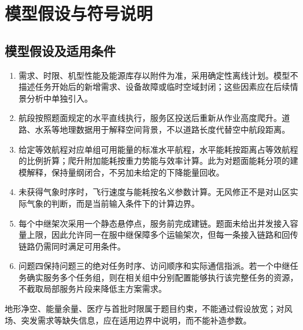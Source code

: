 \section{模型假设与符号说明}
\subsection{模型假设及适用条件}
\begin{enumerate}
\item 需求、时限、机型性能及能源库存以附件为准，采用确定性离线计划。模型不描述任务开始后的新增需求、设备故障或临时空域封闭；这些因素应在后续情景分析中单独引入。
\item 航段按照题面规定的水平直线执行，服务区投送后重新从作业高度爬升。道路、水系等地理数据用于解释空间背景，不以道路长度代替空中航段距离。
\item 给定等效航程对应单组可用能量的标准水平航程，水平能耗按距离占等效航程的比例折算；爬升附加能耗按重力势能与效率计算。此为对题面能耗分项的建模解释，保持量纲闭合，不另加未给定的下降能量回收。
\item 未获得气象时序时，飞行速度与能耗按名义参数计算。无风修正不是对山区实际气象的判断，而是当前输入条件下的计算边界。
\item 每个中继架次采用一个静态悬停点，服务前完成建链。题面未给出并发接入容量上限，因此允许同一在服中继保障多个运输架次，但每一条接入链路和回传链路仍需同时满足可用条件。
\item 问题四保持问题三的绝对任务时序、访问顺序和实际通信指派。若一个中继任务确实服务多个任务组，则在相关组中分别配置能够执行该完整任务的资源，不截取局部服务片段来降低主方案需求。
\end{enumerate}
地形净空、能量余量、医疗与首批时限属于题目约束，不能通过假设放宽；对风场、突发需求等缺失信息，应在适用边界中说明，而不能补造参数。

